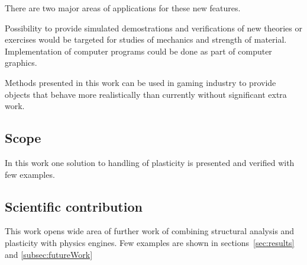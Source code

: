 There are two major areas of applications for these new features.

Possibility to provide simulated demostrations and verifications of new theories or exercises  would be targeted for 
studies of mechanics and strength of material. Implementation of computer programs could be done as part of computer graphics.
 
Methods presented in this work can be used in gaming industry to provide objects that behave more realistically than currently without significant extra work.

\subsection{Scope}

In this work one solution to handling of plasticity is presented and verified with few examples.

\subsection{Scientific contribution}

This work opens wide area of further work of combining structural analysis and plasticity with physics engines.
Few examples are shown in sections~\ref{sec:results} and \ref{subsec:futureWork}

\cleardoublepage
